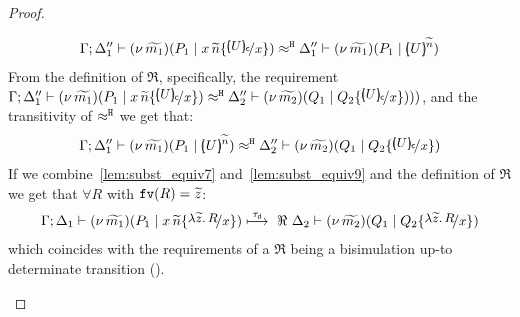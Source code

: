 \begin{proof}
\begin{enumerate}
\begin{enumerate}[i.]
%
						\begin{eqnarray*}
							\horel{\Gamma}{\Delta_1''}{\newsp{\widetilde{m_1}}{P_1 \Par \appl{x}{\widetilde{n}} \subst{\omapchar{U}}{x}}}
							{\hwb}
							{\Delta_1''}{\newsp{\widetilde{m_1}}{P_1 \Par \mapchar{U}{\widetilde{n}}}}%
						\end{eqnarray*}
%
						From the definition of $\Re$, specifically, the requirement
						$\horel{\Gamma}{\Delta_1''}{\newsp{\widetilde{m_1}}{P_1 \Par \appl{x}{\widetilde{n}} \subst{\omapchar{U}}{x}}}
						{\hwb}{\Delta_2''}{\newsp{\widetilde{m_2}}{Q_1 \Par Q_2 \subst{\omapchar{U}}{x}}))}$,
						and the transitivity of $\approx^\mathtt{H}$ we get that:
%
						\begin{eqnarray}
							\horel{\Gamma}{\Delta_1''}{\newsp{\widetilde{m_1}}{P_1 \Par \mapchar{U}{\widetilde{n}}}}
							{\hwb}
							{\Delta_2''}{\newsp{\widetilde{m_2}}{Q_1 \Par Q_2 \subst{\omapchar{U}}{x}}}
							\label{lem:subst_equiv9}
						\end{eqnarray}
%
						\noi
						If we combine~\eqref{lem:subst_equiv7} and~\eqref{lem:subst_equiv9} and the definition of $\Re$ we get that
						$\forall R$ with $\mathtt{fv}(R) = \widetilde{z}$:
						\begin{eqnarray*}
							\horel{\Gamma}{\Delta_1}{\newsp{\widetilde{m_1}}{P_1 \Par \appl{x}{\widetilde{n}} \subst{\abs{\widetilde{z}}{R}}{x}  }}
							{\hby{\dtau} \ \Re\ }
							{\Delta_2}{\newsp{\widetilde{m_2}}{Q_1 \Par Q_2 \subst{\abs{\widetilde{z}}{R}}{x}}}
						\end{eqnarray*}
						which coincides with the requirements of a $\Re$ being a bisimulation
						up-to determinate transition ().
			\end{enumerate}


\end{enumerate}
\end{proof}

